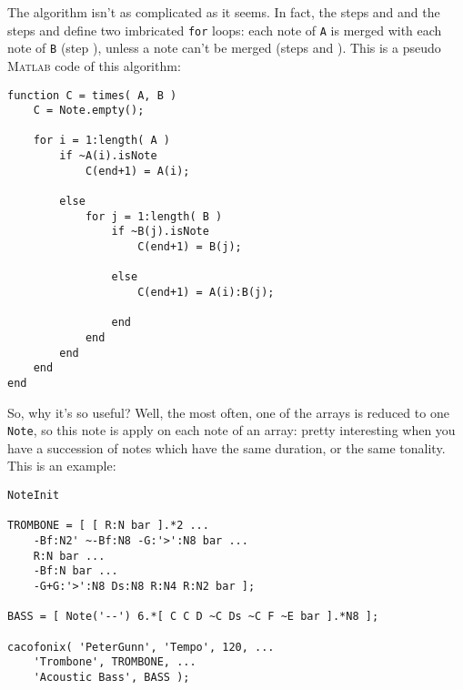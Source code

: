 \documentclass{article}
\newcommand{\matlab}{\textsc{Matlab}\xspace}
\newcommand{\note}{\lstinline!Note!\xspace}
\newcommand{\titlealgo}{}
\newcommand{\stepref}[2][]{\ifthenelse{\equal{#1}{}}{\titlealgo\ref{Algo \titlealgo.Step #2}}{#1\ref{Algo #1.Step #2}}}
\begin{document}
The algorithm isn't as complicated as it seems. In fact, the steps \stepref[T]{checki} and \stepref[T]{inci} and the steps \stepref[T]{checkj} and \stepref[T]{incj} define two imbricated \lstinline!for! loops: each note of \lstinline!A! is merged with each note of \lstinline!B! (step \stepref[T]{addAiBj}), unless a note can't be merged (steps \stepref[T]{addAi} and \stepref[T]{addBj}). This is a pseudo \matlab code of this algorithm:
\begin{lstlisting}
function C = times( A, B )
	C = Note.empty();

	for i = 1:length( A )
		if ~A(i).isNote
			C(end+1) = A(i);

		else
			for j = 1:length( B )
				if ~B(j).isNote
					C(end+1) = B(j);

				else
					C(end+1) = A(i):B(j);

				end
			end
		end
	end
end
\end{lstlisting}

So, why it's so useful? Well, the most often, one of the arrays is reduced to one \note, so this note is apply on each note of an array: pretty interesting when you have a succession of notes which have the same duration, or the same tonality. This is an example:


\begin{lstlisting}
NoteInit

TROMBONE = [ [ R:N bar ].*2 ...
	-Bf:N2' ~-Bf:N8 -G:'>':N8 bar ...
	R:N bar ...
	-Bf:N bar ...
	-G+G:'>':N8 Ds:N8 R:N4 R:N2 bar ];

BASS = [ Note('--') 6.*[ C C D ~C Ds ~C F ~E bar ].*N8 ];

cacofonix( 'PeterGunn', 'Tempo', 120, ...
	'Trombone', TROMBONE, ...
	'Acoustic Bass', BASS );	
\end{lstlisting}
\end{document}
